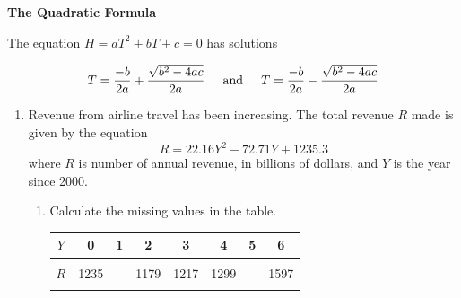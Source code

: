 \documentclass[11pt]{article}
\begin{document}
 \vspace{.2in}
 
 \begin{center}
\textbf{The Quadratic Formula}
\vspace{.1in}

The equation $H=aT^2+bT+c=0$ has solutions 


$$\displaystyle T=\frac{-b}{2a} + \frac{\sqrt{b^2-4ac}}{2a} \hspace{.2in} \text{and} \hspace{.2in}T=\frac{-b}{2a} - \frac{\sqrt{b^2-4ac}}{2a}$$

 \end{center}
\hrulefill

\newpage

\begin{enumerate}

\item Revenue from airline travel has been increasing.  The total revenue $R$ made is given by the equation $$R = 22.16Y^2-72.71Y+1235.3$$
where $R$ is number of annual revenue, in billions of dollars, and $Y$ is the year since 2000.

\begin{enumerate}
\item Calculate the missing values in the table.




\begin{center}
\begin{tabular} {|c ||c |c |c |c |c |c |c |} \hline
$Y$ & \hspace{.25in}0  \hspace{.25in}   &\hspace{.25in} 1\hspace{.25in} & \hspace{.25in} 2   \hspace{.25in} &\hspace{.25in} 3  \hspace{.25in}  & \hspace{.25in}4   \hspace{.25in}  &\hspace{.25in}5  \hspace{.25in}& \hspace{.25in} 6 \hspace{.25in}  \\ \hline
&&&&&&& \\
$R$ &1235 &  & 1179 & 1217 & 1299 &   & 1597  \\ 
&&&&&&& \\ \hline
\end{tabular}
\end{center}





\end{enumerate}
\end{enumerate}
\end{document}
